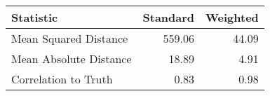 \begin{tabular}{lrr}
  \hline
Statistic & Standard & Weighted \\ 
  \hline
Mean Squared Distance & 559.06 & 44.09 \\ 
  Mean Absolute Distance & 18.89 & 4.91 \\ 
  Correlation to Truth & 0.83 & 0.98 \\ 
   \hline
\end{tabular}
